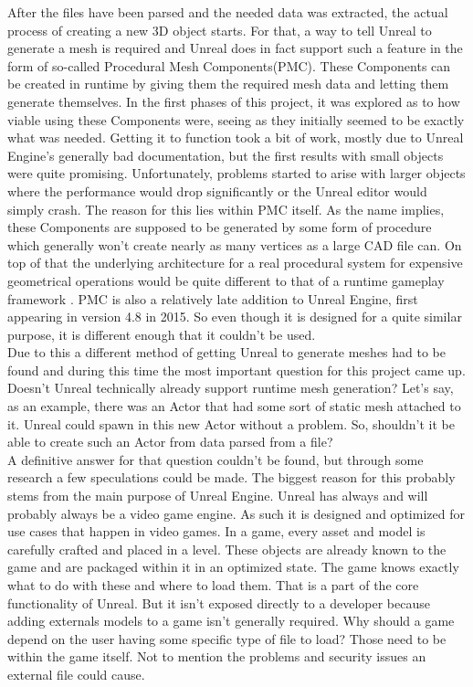 After the files have been parsed and the needed data was extracted, the actual process of creating a new 3D object starts. For that, a way to tell Unreal to generate a mesh is required and Unreal does in fact support such a feature in the form of so-called Procedural Mesh Components(\acs{PMC})\cite{bib:UEPawn}. These Components can be created in runtime by giving them the required mesh data and letting them generate themselves. In the first phases of this project, it was explored as to how viable using these Components were, seeing as they initially seemed to be exactly what was needed. Getting it to function took a bit of work, mostly due to Unreal Engine's generally bad documentation, but the first results with small objects were quite promising. Unfortunately, problems started to arise with larger objects where the performance would drop significantly or the Unreal editor would simply crash. The reason for this lies within \acs{PMC} itself. As the name implies, these Components are supposed to be generated by some form of procedure which generally won't create nearly as many vertices as a large \acs{CAD} file can. On top of that the underlying architecture for a real procedural system for expensive geometrical operations would be quite different to that of a runtime gameplay framework \cite{bib:ProcProb}. \acs{PMC} is also a relatively late addition to Unreal Engine, first appearing in version 4.8 in 2015. So even though it is designed for a quite similar purpose, it is different enough that it couldn't be used.\\
Due to this a different method of getting Unreal to generate meshes had to be found and during this time the most important question for this project came up. Doesn't Unreal technically already support runtime mesh generation? Let's say, as an example, there was an Actor that had some sort of static mesh attached to it. Unreal could spawn in this new Actor without a problem. So, shouldn't it be able to create such an Actor from data parsed from a file?\\
A definitive answer for that question couldn't be found, but through some research a few speculations could be made. The biggest reason for this probably stems from the main purpose of Unreal Engine. Unreal has always and will probably always be a video game engine. As such it is designed and optimized for use cases that happen in video games. In a game, every asset and model is carefully crafted and placed in a level. These objects are already known to the game and are packaged within it in an optimized state. The game knows exactly what to do with these and where to load them. That is a part of the core functionality of Unreal. But it isn't exposed directly to a developer because adding externals models to a game isn't generally required. Why should a game depend on the user having some specific type of file to load? Those need to be within the game itself. Not to mention the problems and security issues an external file could cause.\\
